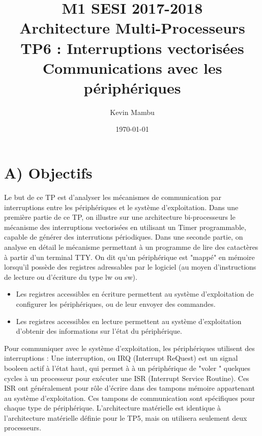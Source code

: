 \documentclass[10pt]{article}
\author{Kevin Mambu}
\date{\today}
\title{M1 SESI 2017-2018\\Architecture Multi-Processeurs\\TP6 : Interruptions
vectorisées \\ Communications avec les périphériques}
\begin{document}
\maketitle

\section{A) Objectifs}
Le but de ce TP est d’analyser les mécanismes de communication par interruptions
entre les périphériques et le système d'exploitation. Dans une première partie
de ce TP, on illustre sur une architecture bi-processeurs le mécanisme des
interruptions vectorisées en utilisant un Timer programmable, capable de générer
des interrutions périodiques. Dans une seconde partie, on analyse en détail le
mécanisme permettant à un programme de lire des catactères à partir d'un terminal
TTY.
\newline
On dit qu'un périphérique est "mappé" en mémoire lorsqu'il possède des
registres adressables par le logiciel (au moyen d’instructions de lecture ou
d’écriture du type lw ou sw).

\begin{itemize}
  \item Les registres accessibles en écriture permettent au système
  d'exploitation de configurer les périphériques, ou de leur envoyer des
  commandes.
  \item Les registres accessibles en lecture permettent au système
  d'exploitation d'obtenir des informations sur l'état du périphérique.
\end{itemize}

Pour communiquer avec le système d'exploitation, les périphériques utilisent des
interruptions : Une interruption, ou IRQ (Interrupt ReQuest) est un signal
booleen actif à l'état haut, qui permet à à un périphérique de "voler " quelques
cycles à un processeur pour exécuter une ISR (Interrupt Service Routine). Ces
ISR ont généralement pour rôle d'écrire dans des tampons mémoire appartenant au
système d'exploitation. Ces tampons de communication sont spécifiques pour
chaque type de périphérique.
\newline
L’architecture matérielle est identique à l'architecture matérielle définie pour
le TP5, mais on utilisera seulement deux processeurs.
\end{document}

